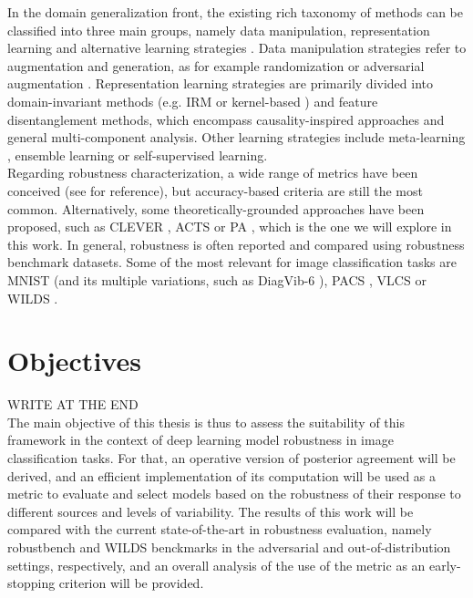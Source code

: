 In the domain generalization front, the existing rich taxonomy 
of methods can be classified into three main groups, namely
data manipulation, representation learning 
and alternative learning strategies
\cite{wangGeneralizingUnseenDomains2022,zhouDomainGeneralizationSurvey2022,liuOutOfDistributionGeneralizationSurvey2023}.
Data manipulation strategies refer to augmentation and generation,
as for example randomization or adversarial augmentation
\cite{yaoImprovingOutofDistributionRobustness2022,zhangMixupEmpiricalRisk2018,yunCutMixRegularizationStrategy2019}.
Representation learning strategies are primarily divided 
into domain-invariant methods (e.g. IRM
\cite{arjovskyInvariantRiskMinimization2020} or
kernel-based
\cite{muandetDomainGeneralizationInvariant2013,arjovskyWassersteinGAN2017}) 
and feature disentanglement methods, which encompass causality-inspired
approaches and general multi-component analysis. Other 
learning strategies include meta-learning
\cite{liLearningGeneralizeMetaLearning2018,wangMetaFineTuningNeural2020},
ensemble learning or self-supervised learning. \\

Regarding robustness characterization, a wide range of metrics
have been conceived (see
\cite{guoComprehensiveEvaluationFramework2023} for reference), but
accuracy-based criteria are still the most common. Alternatively, 
some  theoretically-grounded approaches have been proposed, such
as CLEVER \cite{wengEvaluatingRobustnessNeural2018}, ACTS 
\cite{wangGeometricalApproachEvaluate2023}
or
PA
\cite{buhmannPosteriorAgreementModel2022}, 
which is the one we will explore in this work. 
In general, robustness is often reported and compared using 
robustness benchmark datasets. Some of the most relevant
for image classification tasks are 
MNIST (and its multiple variations, such as DiagVib-6
\cite{euligDiagViB6DiagnosticBenchmark2021}),
PACS
\cite{yuPACSDatasetPhysical2022},
VLCS
\cite{khoslaUndoingDamageDataset2012}
or WILDS
\cite{kohWILDSBenchmarkIntheWild2021}.

\section{Objectives}

WRITE AT THE END \\

The main objective of this thesis is thus to assess
the suitability of this framework in the context of deep 
learning model robustness in image classification tasks. 
For that, an operative version of posterior
agreement will be derived, and an efficient implementation of its
computation will be used as a metric to evaluate and select models
based on the robustness of their response to different sources and
levels of variability. The results of this work will be compared
with the current state-of-the-art in robustness evaluation, namely
robustbench
\cite{croceRobustBenchStandardizedAdversarial2021}
and WILDS 
\cite{kohWILDSBenchmarkIntheWild2021}
benckmarks in the adversarial and
out-of-distribution settings, respectively, and an overall
analysis of the use of the metric as an early-stopping 
criterion will be provided.\\


